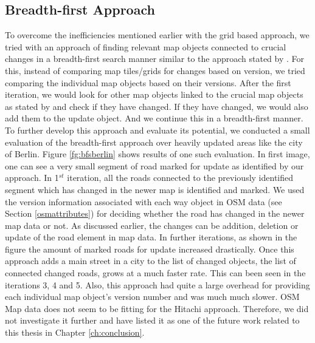 \subsection{Breadth-first Approach}
To overcome the inefficiencies mentioned earlier with the grid based approach, we tried with an approach of finding relevant map objects connected to crucial changes in a breadth-first search manner similar to the approach stated by \citet{hitachi}. For this, instead of comparing map tiles/grids for changes based on version, we tried comparing the individual map objects based on their versions. After the first iteration, we would look for other map objects linked to the crucial map objects as stated by \citet{hitachi} and check if they have changed. If they have changed, we would also add them to the update object. And we continue this in a breadth-first manner. To further develop this approach and evaluate its potential, we conducted a small evaluation of the breadth-first approach over heavily updated areas like the city of Berlin. Figure \ref{fg:bfsberlin} shows results of one such evaluation. In first image, one can see a very small segment of road marked for update as identified by our approach. In 1$^{st}$ iteration, all the roads connected to the previously identified segment which has changed in the newer map is identified and marked. We used the version information associated with each way object in OSM data (see Section \ref{osmattributes}) for deciding whether the road has changed in the newer map data or not. As discussed earlier, the changes can be addition, deletion or update of the road element in map data. In further iterations, as shown in the figure the amount of marked roads for update increased drastically. Once this approach adds a main street in a city to the list of changed objects, the list of connected changed roads, grows at a much faster rate. This can been seen in the iterations 3, 4 and 5. Also, this approach had quite a large overhead for providing each individual map object's version number and was much much slower. OSM Map data does not seem to be fitting for the Hitachi approach. Therefore, we did not investigate it further and have listed it as one of the future work related to this thesis in Chapter \ref{ch:conclusion}.   




